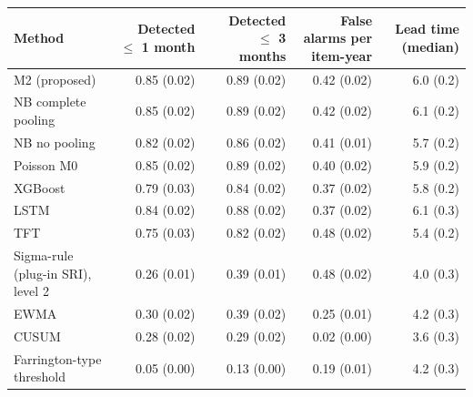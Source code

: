 \documentclass[10pt,a4paper]{article}
\begin{document}
\noindent\begin{minipage}{\linewidth}
\label{tab:S1-2}
\centering\footnotesize
\begin{tabular}{lrrrr}
\toprule
Method & Detected $\le$ 1 month & Detected $\le$ 3 months & False alarms per item-year & Lead time (median) \\ \midrule
M2 (proposed) & 0.85 (0.02) & 0.89 (0.02) & 0.42 (0.02) & 6.0 (0.2) \\
NB complete pooling & 0.85 (0.02) & 0.89 (0.02) & 0.42 (0.02) & 6.1 (0.2) \\
NB no pooling & 0.82 (0.02) & 0.86 (0.02) & 0.41 (0.01) & 5.7 (0.2) \\
Poisson M0 & 0.85 (0.02) & 0.89 (0.02) & 0.40 (0.02) & 5.9 (0.2) \\
XGBoost & 0.79 (0.03) & 0.84 (0.02) & 0.37 (0.02) & 5.8 (0.2) \\
LSTM & 0.84 (0.02) & 0.88 (0.02) & 0.37 (0.02) & 6.1 (0.3) \\
TFT & 0.75 (0.03) & 0.82 (0.02) & 0.48 (0.02) & 5.4 (0.2) \\
Sigma-rule (plug-in SRI), level 2 & 0.26 (0.01) & 0.39 (0.01) & 0.48 (0.02) & 4.0 (0.3) \\
EWMA & 0.30 (0.02) & 0.39 (0.02) & 0.25 (0.01) & 4.2 (0.3) \\
CUSUM & 0.28 (0.02) & 0.29 (0.02) & 0.02 (0.00) & 3.6 (0.3) \\
Farrington-type threshold & 0.05 (0.00) & 0.13 (0.00) & 0.19 (0.01) & 4.2 (0.3) \\
\bottomrule
\end{tabular}
\end{minipage}
\vspace{22pt}
\end{document}
